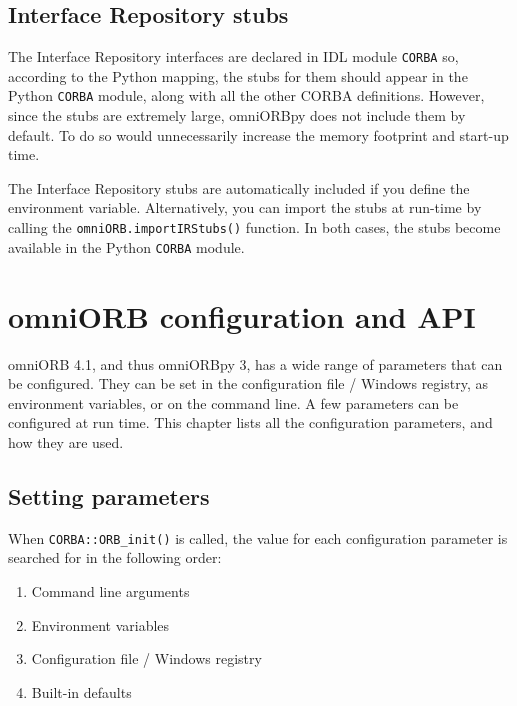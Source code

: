 \documentclass[11pt,twoside,a4paper]{book}
\newcommand{\module}[1]{\texttt{#1}}
\newcommand{\op}[1]{\texttt{#1()}}
\newcommand{\envvar}{\begingroup \urlstyle{tt}\Url}
\begin{document}
\section{Interface Repository stubs}
\label{sec:ifrstubs}

The Interface Repository interfaces are declared in IDL module
\module{CORBA} so, according to the Python mapping, the stubs for them
should appear in the Python \module{CORBA} module, along with all the
other CORBA definitions. However, since the stubs are extremely large,
omniORBpy does not include them by default. To do so would
unnecessarily increase the memory footprint and start-up time.

The Interface Repository stubs are automatically included if you
define the \envvar{OMNIORBPY_IMPORT_IR_STUBS} environment variable.
Alternatively, you can import the stubs at run-time by calling the
\op{omniORB.importIRStubs} function. In both cases, the stubs become
available in the Python \module{CORBA} module.



\chapter{omniORB configuration and API}
\label{chap:config}

omniORB 4.1, and thus omniORBpy 3, has a wide range of parameters that
can be configured. They can be set in the configuration file / Windows
registry, as environment variables, or on the command line. A few
parameters can be configured at run time. This chapter lists all the
configuration parameters, and how they are used.

\section{Setting parameters}

When \op{CORBA::ORB\_init} is called, the value for each configuration
parameter is searched for in the following order:

\begin{enumerate}

\item Command line arguments
\item Environment variables
\item Configuration file / Windows registry
\item Built-in defaults

\end{enumerate}
\end{document}
